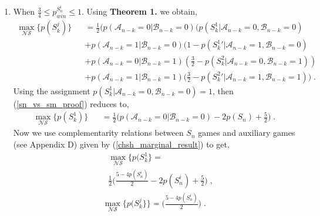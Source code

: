 \begin{widetext}
\begin{appendices}
\begin{enumerate}
\item When $\frac{3}{4} \le p_{win}^{S_n^i} \le 1$. Using \textbf{Theorem 1.} we obtain,
\begin{eqnarray}
\label{sn_vs_sm_proof}
\max_{\mathcal{NS}}\{p({S_{k}^j})\} &&= \frac{1}{2} \bigg( p(\mathcal{A}_{n-k}=0|\mathcal{B}_{n-k}=0)(p(S_{k}^1|\mathcal{A}_{n-k}=0,\mathcal{B}_{n-k}=0){}\nonumber\\&&+p(\mathcal{A}_{n-k}=1|\mathcal{B}_{n-k}=0)(1-p({S_{k}^1}'|\mathcal{A}_{n-k}=1,\mathcal{B}_{n-k}=0)\nonumber\\&&
+p(\mathcal{A}_{n-k}=0|\mathcal{B}_{n-k}=1)(\frac{3}{2}-p(S_{k}^2|\mathcal{A}_{n-k}=0,\mathcal{B}_{n-k}=1)){}\nonumber\\&&+p(\mathcal{A}_{n-k}=1|\mathcal{B}_{n-k}=1)(\frac{3}{2}-p({S_{k}^2}'|\mathcal{A}_{n-k}=1,\mathcal{B}_{n-k}=1) \bigg) \; . 
\end{eqnarray}
Using the assignment $p(S_{k}^1|\mathcal{A}_{n-k}=0,\mathcal{B}_{n-k}=0)=1$, then (\ref{sn_vs_sm_proof}) reduces to,
\begin{eqnarray}
\label{general_win_probability3}
\max_{\mathcal{NS}}\{p(S_{k}^1)\} &&= \frac{1}{2} \bigg( p(\mathcal{A}_{n-k}=0|\mathcal{B}_{n-k}=0)-2p({S_{n}})+\frac{5}{2}\bigg) \; . 
\end{eqnarray}
Now we use complementarity relations between $S_n$ games and auxiliary games (see Appendix D) given by (\ref{chsh_marginal_result}) to get,
\begin{eqnarray}
&&\max_{\mathcal{NS}}\{p({S_{k}^1}\}= {}\nonumber\\&&
\frac{1}{2} \bigg( \frac{5-4p(S_{n}^i)}{2}-2p({S_{n}^i})+\frac{5}{2}\bigg) \; ,
\end{eqnarray}
\begin{eqnarray}
\label{sn_vs_sm_final}
\max_{\mathcal{NS}}\{p({S_k^j}\} \}=\bigg( \frac{5-4p({S_{n}^i})}{2} \bigg) \; .
\end{eqnarray}
\end{enumerate}

\end{appendices}

\end{widetext}
